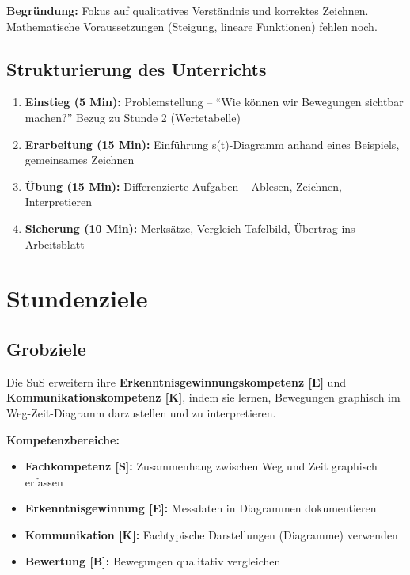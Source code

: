 \documentclass[11pt,a4paper]{article}
\begin{document}
\textbf{Begründung:} Fokus auf qualitatives Verständnis und korrektes Zeichnen. Mathematische Voraussetzungen (Steigung, lineare Funktionen) fehlen noch.

\subsection{Strukturierung des Unterrichts}
\begin{enumerate}
    \item \textbf{Einstieg (5 Min):} Problemstellung -- ``Wie können wir Bewegungen sichtbar machen?'' Bezug zu Stunde 2 (Wertetabelle)
    \item \textbf{Erarbeitung (15 Min):} Einführung s(t)-Diagramm anhand eines Beispiels, gemeinsames Zeichnen
    \item \textbf{Übung (15 Min):} Differenzierte Aufgaben -- Ablesen, Zeichnen, Interpretieren
    \item \textbf{Sicherung (10 Min):} Merksätze, Vergleich Tafelbild, Übertrag ins Arbeitsblatt
\end{enumerate}

\section{Stundenziele}

\subsection{Grobziele}
Die SuS erweitern ihre \textbf{Erkenntnisgewinnungskompetenz [E]} und \textbf{Kommunikationskompetenz [K]}, indem sie lernen, Bewegungen graphisch im Weg-Zeit-Diagramm darzustellen und zu interpretieren.

\textbf{Kompetenzbereiche:}
\begin{itemize}
    \item \textbf{Fachkompetenz [S]:} Zusammenhang zwischen Weg und Zeit graphisch erfassen
    \item \textbf{Erkenntnisgewinnung [E]:} Messdaten in Diagrammen dokumentieren
    \item \textbf{Kommunikation [K]:} Fachtypische Darstellungen (Diagramme) verwenden
    \item \textbf{Bewertung [B]:} Bewegungen qualitativ vergleichen
\end{itemize}
\end{document}
